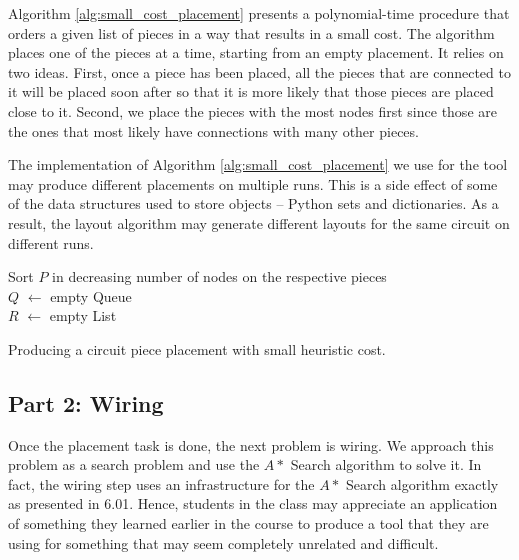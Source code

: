 Algorithm \ref{alg:small_cost_placement} presents a polynomial-time procedure
that orders a
given list of pieces in a way that results in a small cost. The algorithm places
one of the pieces at a time, starting from an empty placement. It relies
on two ideas. First, once a piece has been placed, all the pieces that are
connected to it will be placed soon after so that it is more likely that those
pieces are placed close to it. Second, we place the pieces with the most nodes
first since those are the ones that most likely have connections with many other
pieces.

The implementation of Algorithm \ref{alg:small_cost_placement} we use for the
tool may produce different placements on multiple runs. This is a side
effect of some of the data structures used to store objects -- Python sets and
dictionaries. As a result, the layout algorithm may generate different layouts
for the same circuit on different runs.

\begin{algorithm}
\BlankLine
Sort $P$ in decreasing number of nodes on the respective pieces\\
$Q$ $\leftarrow$ empty Queue\\
$R$ $\leftarrow$ empty List\\
\caption{Producing a circuit piece placement with small heuristic cost.}
\label{alg:small_cost_placement}
\end{algorithm}

\subsection{Part 2: Wiring}

Once the placement task is done, the next problem is wiring.
We approach this problem as a search problem and use the $A*$ Search algorithm to
solve it. In fact, the wiring step uses an infrastructure for the $A*$ Search
algorithm exactly as presented in 6.01. Hence, students in
the class may appreciate an application of something they learned
earlier in the course to produce a tool that they are using for something that
may seem completely unrelated and difficult.

